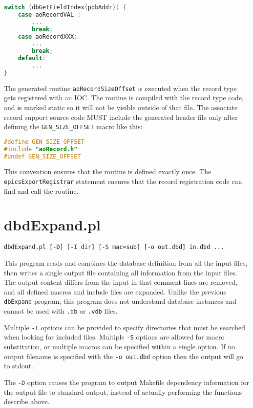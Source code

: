 \begin{lstlisting}[language=C]
switch (dbGetFieldIndex(pdbAddr)) {
    case aoRecordVAL :
        ...
        break;
    case aoRecordXXX:
        ...
        break;
    default:
        ...
}
\end{lstlisting}

The generated routine \verb|aoRecordSizeOffset| is executed when the record type gets registered with an IOC.
The routine is compiled with the record type code, and is marked static so it will not be visible outside of that file.
The associate record support source code MUST include the generated header file only after defining the \verb|GEN_SIZE_OFFSET| macro like this:

\begin{lstlisting}[language=C]
#define GEN_SIZE_OFFSET
#include "aoRecord.h"
#undef GEN_SIZE_OFFSET
\end{lstlisting}

This convention ensures that the routine is defined exactly once.
The \verb|epicsExportRegistrar| statement ensures that the record registration code can find and call the routine.

\section{dbdExpand.pl}

\begin{lstlisting}[language=dbd]
dbdExpand.pl [-D] [-I dir] [-S mac=sub] [-o out.dbd] in.dbd ...
\end{lstlisting}

This program reads and combines the database definition from all the input files, then writes a single output file containing all information from the 
input files.
The output content differs from the input in that comment lines are removed, and all defined macros and include files are expanded.
Unlike the previous \verb|dbExpand| program, this program does not understand database instances and cannot be used with \verb|.db| or \verb|.vdb| files.

Multiple \verb|-I| options can be provided to specify directories that must be searched when looking for included files.
Multiple \verb|-S| options are allowed for macro substitution, or multiple macros can be specified within a single option.
If no output filename is specified with the \verb|-o out.dbd| option then the output will go to stdout.

The \verb|-D| option causes the program to output Makefile dependency information for the output file to standard output, instead of actually performing the functions describe above.

